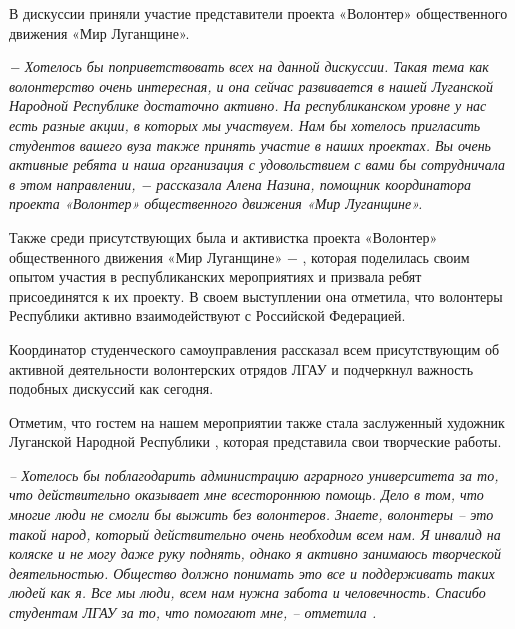 В дискуссии приняли участие представители проекта «Волонтер» общественного
движения «Мир Луганщине».

\begin{displayquote}
\em\color{magenta}
− Хотелось бы поприветствовать всех на данной дискуссии. Такая тема как
волонтерство очень интересная, и она сейчас развивается в нашей Луганской
Народной Республике достаточно активно. На республиканском уровне у нас
есть разные акции, в которых мы участвуем. Нам бы хотелось пригласить
студентов вашего вуза также принять участие в наших проектах. Вы очень
активные ребята и наша организация с удовольствием с вами бы сотрудничала в
этом направлении, − рассказала Алена Назина, помощник координатора проекта
«Волонтер» общественного движения «Мир Луганщине».
\end{displayquote}

Также среди присутствующих была и активистка проекта «Волонтер» общественного
движения «Мир Луганщине» − , которая поделилась
своим опытом участия в республиканских мероприятиях и призвала ребят
присоединятся к их проекту. В своем выступлении она отметила, что волонтеры
Республики активно взаимодействуют с Российской Федерацией.

Координатор студенческого самоуправления  рассказал
всем присутствующим об активной деятельности волонтерских отрядов ЛГАУ и
подчеркнул важность подобных дискуссий как сегодня.


Отметим, что гостем на нашем мероприятии также стала заслуженный художник
Луганской Народной Республики , которая
представила свои творческие работы.

\begin{displayquote}
\em\color{magenta}
– Хотелось бы поблагодарить администрацию аграрного университета за то, что
действительно оказывает мне всестороннюю помощь. Дело в том, что многие люди не
смогли бы выжить без волонтеров. Знаете, волонтеры – это такой народ, который
действительно очень необходим всем нам. Я инвалид на коляске и не могу даже
руку поднять, однако я активно занимаюсь творческой деятельностью. Общество
должно понимать это все и поддерживать таких людей как я. Все мы люди, всем нам
нужна забота и человечность. Спасибо студентам ЛГАУ за то, что помогают мне, –
отметила .
\end{displayquote}

